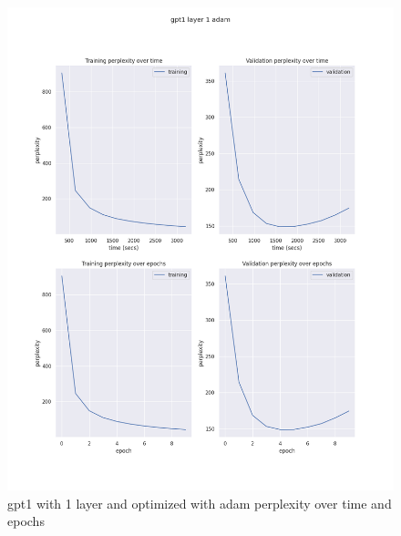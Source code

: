 \documentclass[12pt]{article}
\theoremstyle{definition}
\begin{document}
\begin{figure}[H]
     \centering
     \includegraphics[scale=0.4]{gpt1_layer_1_adam.png}
     \caption{gpt1 with 1 layer and optimized with adam perplexity over time and epochs}
\end{figure}
\end{document}

